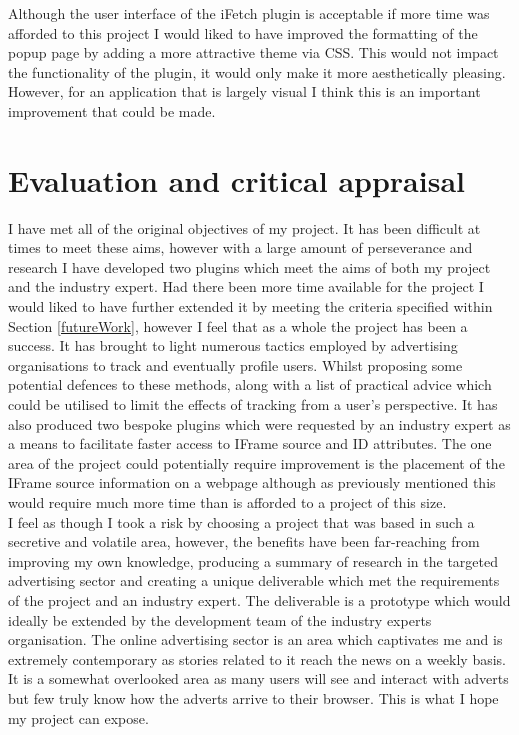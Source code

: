 \documentclass[12pt]{article}
\begin{document}
Although the user interface of the iFetch plugin is acceptable if more time was afforded to this project I would liked to have improved the formatting of the popup page by adding a more attractive theme via CSS. This would not impact the functionality of the plugin, it would only make it more aesthetically pleasing. However, for an application that is largely visual I think this is an important improvement that could be made.

\section{Evaluation and critical appraisal}
I have met all of the original objectives of my project. It has been difficult at times to meet these aims, however with a large amount of perseverance and research I have developed two plugins which meet the aims of both my project and the industry expert. Had there been more time available for the project I would liked to have further extended it by meeting the criteria specified within Section \ref{futureWork}, however I feel that as a whole the project has been a success. It has brought to light numerous tactics employed by advertising organisations to track and eventually profile users. Whilst proposing some potential defences to these methods, along with a list of practical advice which could be utilised to limit the effects of tracking from a user's perspective. It has also produced two bespoke plugins which were requested by an industry expert as a means to facilitate faster access to IFrame source and ID attributes. The one area of the project could potentially require improvement is the placement of the IFrame source information on a webpage although as previously mentioned this would require much more time than is afforded to a project of this size. \\

I feel as though I took a risk by choosing a project that was based in such a secretive and volatile area, however, the benefits have been far-reaching from improving my own knowledge, producing a summary of research in the targeted advertising sector and creating a unique deliverable which met the requirements of the project and an industry expert. The deliverable is a prototype which would ideally be extended by the development team of the industry experts organisation. The online advertising sector is an area which captivates me and is extremely contemporary as stories related to it reach the news on a weekly basis. It is a somewhat overlooked area as many users will see and interact with adverts but few truly know how the adverts arrive to their browser. This is what I hope my project can expose. \\
\end{document}
